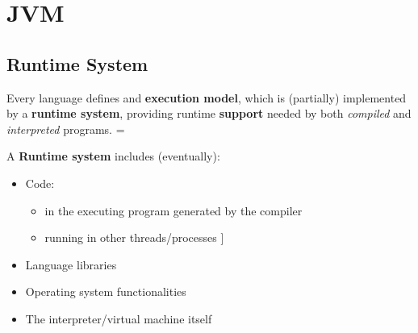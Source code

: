 \chapter{JVM}
\section{Runtime System}
Every language defines and \textbf{execution model}, which is (partially) implemented by a \textbf{runtime system},
providing runtime \textbf{support} needed by both \textit{compiled} and \textit{interpreted} programs.
\parskip = \baselineskip

A \textbf{Runtime system} includes (eventually):
\begin{itemize}
    \item Code:
    \begin{itemize}
        \item in the executing program generated by the compiler
        \item running in other threads/processes ]
    \end{itemize}
    \item Language libraries
    \item Operating system functionalities
    \item The interpreter/virtual machine itself
\end{itemize}



